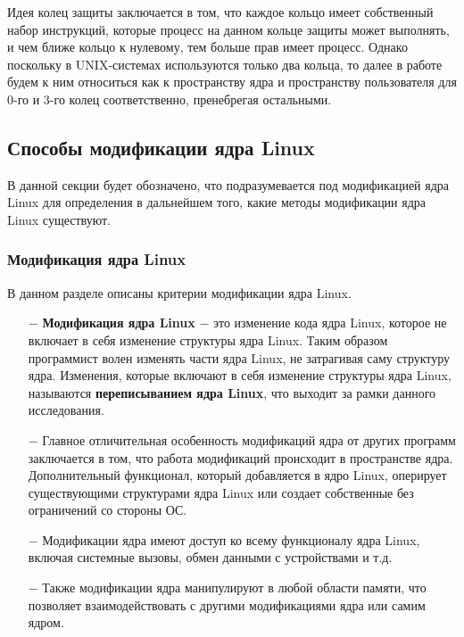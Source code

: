 
Идея колец защиты заключается в том, что каждое кольцо имеет собственный набор инструкций, которые процесс на данном кольце защиты может выполнять, и чем ближе кольцо к нулевому, тем больше прав имеет процесс.
Однако поскольку в UNIX-системах используются только два кольца, то далее в работе будем к ним относиться как к пространству ядра и пространству пользователя для 0-го и 3-го колец соответственно, пренебрегая остальными.

\subsection{Способы модификации ядра Linux}\label{sec:--anal--methods}

В данной секции будет обозначено, что подразумевается под модификацией ядра Linux для определения в дальнейшем того, какие методы модификации ядра Linux существуют.

\subsubsection{Модификация ядра Linux}\label{subsec:--anal--methods--mod}

В данном разделе описаны критерии модификации ядра Linux.

\begin{itemize}
    \item[$-$] \textbf{Модификация ядра Linux} $-$ это изменение кода ядра Linux, которое не включает в себя изменение структуры ядра Linux.
    Таким образом программист волен изменять части ядра Linux, не затрагивая саму структуру ядра.
    Изменения, которые включают в себя изменение структуры ядра Linux, называются \textbf{переписыванием ядра Linux}, что выходит за рамки данного исследования.
    \item[$-$] Главное отличительная особенность модификаций ядра от других программ заключается в том, что работа модификаций происходит в пространстве ядра.
    Дополнительный функционал, который добавляется в ядро Linux, оперирует существующими структурами ядра Linux или создает собственные без ограничений со стороны ОС.
    \item[$-$] Модификации ядра имеют доступ ко всему функционалу ядра Linux, включая системные вызовы, обмен данными с устройствами и т.д.
    \item[$-$] Также модификации ядра манипулируют в любой области памяти, что позволяет взаимодействовать с другими модификациями ядра или самим ядром.
\end{itemize}

